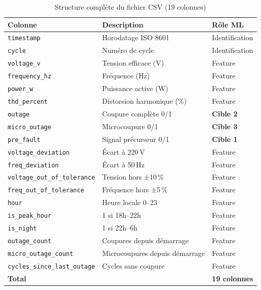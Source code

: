 \documentclass[12pt,a4paper]{article}
\begin{document}
\begin{table}[h]
\centering
\begin{tabular}{@{}lp{7cm}l@{}}
\toprule
Colonne & Description & Rôle ML \\
\midrule
\texttt{timestamp}                   & Horodatage ISO 8601 & Identification \\
\texttt{cycle}                       & Numéro de cycle & Identification \\
\texttt{voltage\_v}                  & Tension efficace (V) & Feature \\
\texttt{frequency\_hz}               & Fréquence (Hz) & Feature \\
\texttt{power\_w}                    & Puissance active (W) & Feature \\
\texttt{thd\_percent}                & Distorsion harmonique (\%) & Feature \\
\texttt{outage}                      & Coupure complète 0/1 & \textbf{Cible 2} \\
\texttt{micro\_outage}               & Microcoupure 0/1 & \textbf{Cible 3} \\
\texttt{pre\_fault}                  & Signal précurseur 0/1 & \textbf{Cible 1} \\
\texttt{voltage\_deviation}          & Écart à 220\,V & Feature \\
\texttt{freq\_deviation}             & Écart à 50\,Hz & Feature \\
\texttt{voltage\_out\_of\_tolerance} & Tension hors ±10\,\% & Feature \\
\texttt{freq\_out\_of\_tolerance}    & Fréquence hors ±5\,\% & Feature \\
\texttt{hour}                        & Heure locale 0–23 & Feature \\
\texttt{is\_peak\_hour}              & 1 si 18h–22h & Feature \\
\texttt{is\_night}                   & 1 si 22h–6h & Feature \\
\texttt{outage\_count}               & Coupures depuis démarrage & Feature \\
\texttt{micro\_outage\_count}        & Microcoupures depuis démarrage & Feature \\
\texttt{cycles\_since\_last\_outage} & Cycles sans coupure & Feature \\
\midrule
\textbf{Total} & & \textbf{19 colonnes} \\
\bottomrule
\end{tabular}
\caption{Structure complète du fichier CSV (19 colonnes)}
\end{table}
\end{document}
